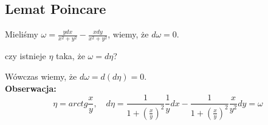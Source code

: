 \documentclass[../main.tex]{subfiles}
\begin{document}
\pagebreak
\subsection{Lemat Poincare}
Mieliśmy $\omega = \frac{ydx}{x^2+y^2} - \frac{xdy}{x^2+y^2}$, wiemy, że $d\omega = 0$.

\begin{pytanie}
    czy istnieje $\eta$ taka, że $\omega = d\eta$?
\end{pytanie}
Wówczas wiemy, że $d\omega = d(d\eta) = 0$.\\
\textbf{Obserwacja:}
 \[
     \eta = arctg \frac{x}{y},\quad d\eta = \frac{1}{1+(\frac{x}{y})^2}\frac{1}{y}dx - \frac{1}{1+(\frac{x}{y})^2}\frac{x}{y^2}dy = \omega
 \]
\end{document}
